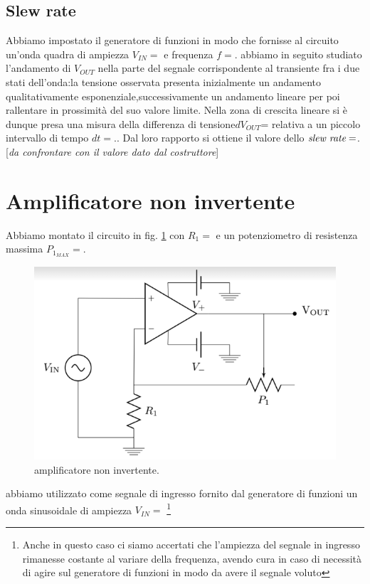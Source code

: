 \documentclass[10pt,a4paper]{article}
\newcommand{\rem}[1]{[\emph{#1}]}
\begin{document}
\subsection{Slew rate}
Abbiamo impostato il generatore di funzioni in modo che fornisse al circuito un’onda quadra di ampiezza $V_{IN} =$ e frequenza $f=$. abbiamo in seguito studiato l'andamento di $V_{OUT}$ nella parte del segnale corrispondente al transiente fra i due stati dell’onda:la tensione osservata presenta inizialmente un andamento qualitativamente esponenziale,successivamente un andamento lineare per poi rallentare in prossimità del suo valore limite. Nella zona di crescita lineare si è dunque presa una misura della differenza di tensione$dV_{OUT}$= relativa a un piccolo intervallo di tempo $dt=$.. Dal loro rapporto si ottiene il valore dello $\emph{slew rate}=$.
\rem{da confrontare con il valore dato dal costruttore}
\section{Amplificatore non invertente}
Abbiamo montato il circuito in fig. \ref{opampnoninvert} con $R_1=$ e  un potenziometro di resistenza massima $P_{1_{MAX}}=$.
\begin{figure}[!htb]
  \centering
  \includegraphics[scale=0.5]{opampnoninvert.png}
\caption{amplificatore non invertente.}
\label{opampnoninvert}
\end{figure}

abbiamo utilizzato come segnale di ingresso fornito dal generatore di funzioni  un onda sinusoidale di ampiezza $V_{IN}=$ \footnote{Anche in questo caso  ci siamo accertati che l'ampiezza del segnale in ingresso rimanesse costante al variare della frequenza, avendo cura in caso di necessità di agire sul generatore di funzioni in modo da avere il segnale voluto} 
\end{document}
